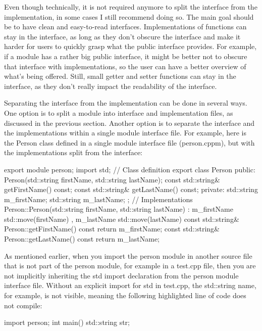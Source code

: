 Even though technically, it is not required anymore to split the interface from the implementation, in some cases I still recommend doing so. The main goal should be to have clean and easy-to-read interfaces. Implementations of functions can stay in the interface, as long as they don’t obscure the interface and make it harder for users to quickly grasp what the public interface provides. For example, if a module has a rather big public interface, it might be better not to obscure that interface with implementations, so the user can have a better overview of what’s being offered. Still, small getter and setter functions can stay in the interface, as they don’t really impact the readability of the interface.

Separating the interface from the implementation can be done in several ways. One option is to split a module into interface and implementation files, as discussed in the previous section. Another option is to separate the interface and the implementations within a single module interface file. For example, here is the Person class defined in a single module interface file (person.cppm), but with the implementations split from the interface:

\begin{cpp}
export module person;
import std;
// Class definition
export class Person
{
    public:
        Person(std::string firstName, std::string lastName);
        const std::string& getFirstName() const;
        const std::string& getLastName() const;
    private:
        std::string m_firstName;
        std::string m_lastName;
};
// Implementations
Person::Person(std::string firstName, std::string lastName)
    : m_firstName { std::move(firstName) }, m_lastName { std::move(lastName) } { }
const std::string& Person::getFirstName() const { return m_firstName; }
const std::string& Person::getLastName() const { return m_lastName; }
\end{cpp}



As mentioned earlier, when you import the person module in another source file that is not part of the person module, for example in a test.cpp file, then you are not implicitly inheriting the std import declaration from the person module interface file. Without an explicit import for std in test.cpp, the std::string name, for example, is not visible, meaning the following highlighted line of code does not compile:

\begin{cpp}
import person;
int main()
{
    std::string str;
}
\end{cpp}

